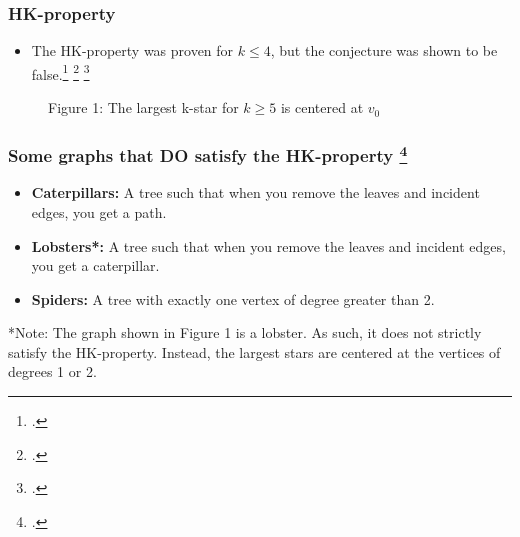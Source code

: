 \documentclass[10pt,]{beamer}
\theoremstyle{conjectureStyle}
\theoremstyle{notationStyle}
\begin{document}
\begin{frame}\frametitle{HK-property}
    \begin{itemize}
        \item The HK-property was proven for $k \leq 4$, but the conjecture was shown to be false.\footcite{MR2523796} \footcite{MR3612439} \footcite{MR3271819}
    \end{itemize}

    \begin{figure}
        \centering
        \caption*{Figure 1: The largest k-star for $k \geq 5$ is centered at $v_0$}
    \end{figure}
\end{frame}

\begin{frame}\frametitle{Some graphs that DO satisfy the HK-property \footcite{MR2763040}}
    \begin{itemize}
        \item \textbf{Caterpillars:} A tree such that when you remove the leaves and incident edges, you get a path.
        \item \textbf{Lobsters*:} A tree such that when you remove the leaves and incident edges, you get a caterpillar.
        \item \textbf{Spiders:} A tree with exactly one vertex of degree greater than 2.
    \end{itemize}

    *Note: The graph shown in Figure 1 is a lobster. As such, it does not strictly satisfy the HK-property. Instead, the largest stars are centered at the vertices of degrees 1 or 2.
\end{frame}
\end{document}
